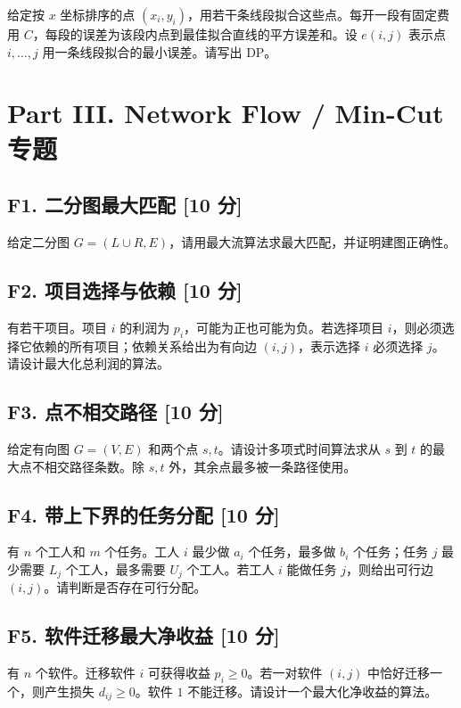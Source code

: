 \documentclass[UTF8,a4paper,11pt]{ctexart}
\newcommand{\points}[1]{\hfill{\small\textbf{[#1 分]}}}
\begin{document}
给定按 $x$ 坐标排序的点 $(x_i,y_i)$，用若干条线段拟合这些点。每开一段有固定费用 $C$，每段的误差为该段内点到最佳拟合直线的平方误差和。设 $e(i,j)$ 表示点 $i,\ldots,j$ 用一条线段拟合的最小误差。请写出 DP。

\newpage
\section*{Part III. Network Flow / Min-Cut 专题}

\subsection*{F1. 二分图最大匹配 \points{10}}

给定二分图 $G=(L\cup R,E)$，请用最大流算法求最大匹配，并证明建图正确性。

\subsection*{F2. 项目选择与依赖 \points{10}}

有若干项目。项目 $i$ 的利润为 $p_i$，可能为正也可能为负。若选择项目 $i$，则必须选择它依赖的所有项目；依赖关系给出为有向边 $(i,j)$，表示选择 $i$ 必须选择 $j$。请设计最大化总利润的算法。

\subsection*{F3. 点不相交路径 \points{10}}

给定有向图 $G=(V,E)$ 和两个点 $s,t$。请设计多项式时间算法求从 $s$ 到 $t$ 的最大点不相交路径条数。除 $s,t$ 外，其余点最多被一条路径使用。

\subsection*{F4. 带上下界的任务分配 \points{10}}

有 $n$ 个工人和 $m$ 个任务。工人 $i$ 最少做 $a_i$ 个任务，最多做 $b_i$ 个任务；任务 $j$ 最少需要 $L_j$ 个工人，最多需要 $U_j$ 个工人。若工人 $i$ 能做任务 $j$，则给出可行边 $(i,j)$。请判断是否存在可行分配。

\subsection*{F5. 软件迁移最大净收益 \points{10}}

有 $n$ 个软件。迁移软件 $i$ 可获得收益 $p_i\ge0$。若一对软件 $(i,j)$ 中恰好迁移一个，则产生损失 $d_{ij}\ge0$。软件 $1$ 不能迁移。请设计一个最大化净收益的算法。
\end{document}
